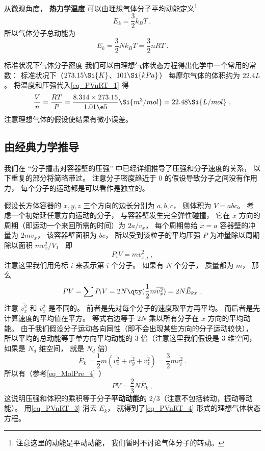 从微观角度， \textbf{热力学温度} 可以由理想气体分子平均动能定义\footnote{注意这里的动能是平动动能， 我们暂时不讨论气体分子的转动。}
\begin{equation}\label{eq_PVnRT_3}
\bar E_k = \frac32 k_B T~,
\end{equation}
所以气体分子总动能为
\begin{equation}\label{eq_PVnRT_5}
E_k = \frac32 Nk_B T = \frac{3}{2}nRT~.
\end{equation}

\begin{example}{标准状况下气体分子密度}
我们可以由理想气体状态方程得出化学中一个常用的常数： 标准状况下（$273.15 \Si{K}$、$101 \Si{kPa}$） 每摩尔气体的体积约为 $22.4L$。 将温度和压强代入\autoref{eq_PVnRT_1} 得
\begin{equation}
\frac{V}{n} = \frac{RT}{P} = \frac{8.314 \times 273.15}{1.01\e5}\Si{m^3/mol} = 22.48 \Si{L/mol}~,
\end{equation}
注意理想气体的假设使结果有微小误差。
\end{example}

\subsection{由经典力学推导}

我们在 “分子撞击对容器壁的压强” 中已经详细推导了压强和分子速度的关系， 以下重复的部分将简略带过。 注意分子密度趋近于 0 的假设导致分子之间没有作用力， 每个分子的运动都是可以看作是独立的。

假设长方体容器的 $x, y, z$ 三个方向的边长分别为 $a, b, c$， 则体积为  $V = abc$。 考虑一个初始延任意方向运动的分子， 与容器壁发生完全弹性碰撞， 它在 $x$ 方向的周期（即运动一个来回所需的时间）为 $2a/v_x$， 每个周期带给 $x = a$ 容器壁的冲量为 $2m v_x$， 该容器壁面积为 $bc$， 所以受到该粒子的平均压强 $P$ 为冲量除以周期除以面积 $mv_x^2/V$， 即
\begin{equation}
P_i V = mv_{x,i}^2~,
\end{equation}
注意这里我们用角标 $i$ 来表示第 $i$ 个分子。 如果有 $N$ 个分子， 质量都为 $m$， 那么
\begin{equation}
P V = \sum P_i V = 2 N \qty(\frac12 m \overline {v_x^2}) = 2 N \bar E_{kx}~,
\end{equation}
注意 $\overline {v_x^2}$ 和 $\bar v_x^2$ 是不同的。 前者是先对每个分子的速度取平方再平均。 而后者是先计算速度的平均值在平方。 等式右边等于 $2N$ 乘以所有分子在 $x$ 方向的平均动能。 由于我们假设分子运动各向同性（即不会出现某些方向的分子运动较快）， 所以平均的总动能等于单方向平均动能的 3 倍（注意这里我们假设是 3 维空间， 如果是 $N_d$ 维空间， 就是 $N_d$ 倍）
\begin{equation}
\bar E_k = \frac{1}{2} m (\overline {v_x^2} + \overline {v_y^2} + \overline {v_z^2}) = \frac{3}{2} m \overline {v_i^2}~.
\end{equation}
所以有（参考\autoref{eq_MolPre_4}~）
\begin{equation}\label{eq_PVnRT_6}
P V = \frac23 N \bar E_k~,
\end{equation}
这说明压强和体积的乘积等于分子\textbf{平动动能}的 $2/3$（注意不包括转动，振动等动能）。 用\autoref{eq_PVnRT_3} 消去 $E_k$， 就得到了\autoref{eq_PVnRT_4} 形式的理想气体状态方程。

